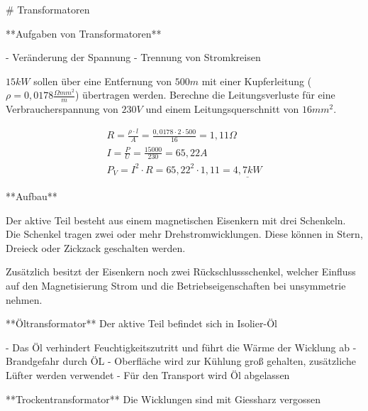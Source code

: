\begin{markdown}

# Transformatoren


**Aufgaben von Transformatoren**

- Veränderung der Spannung
- Trennung von Stromkreisen

\end{markdown}

\vspace{1em}

$15 kW$ sollen über eine Entfernung von $500m$ mit einer Kupferleitung ($\rho = 0,0178 \frac{\Omega mm^2}{m} $) übertragen werden. Berechne die Leitungsverluste für eine Verbraucherspannung von $230 V$ und einem Leitungsquerschnitt von $16mm^2$.

\begin{gather*}
    R = \frac{\rho \cdot l}{A} = \frac{0,0178 \cdot 2 \cdot 500}{16} = 1,11 \Omega \\
    I = \frac{P}{U} = \frac{15000}{230} = 65,22 A \\
    P_V = I^2 \cdot R = 65,22^2 \cdot 1,11 = \underline{4,7 kW}
\end{gather*}

\begin{markdown}

**Aufbau**

Der aktive Teil besteht aus einem magnetischen Eisenkern mit drei Schenkeln. Die Schenkel tragen zwei oder mehr Drehstromwicklungen. Diese können in Stern, Dreieck oder Zickzack geschalten werden.

Zusätzlich besitzt der Eisenkern noch zwei Rückschlussschenkel, welcher Einfluss auf den Magnetisierung Strom und die Betriebseigenschaften bei unsymmetrie nehmen.

\vspace{1em}

**Öltransformator** \qquad Der aktive Teil befindet sich in Isolier-Öl

- Das Öl verhindert Feuchtigkeitszutritt und führt die Wärme der Wicklung ab
- Brandgefahr durch ÖL
- Oberfläche wird zur Kühlung groß gehalten, zusätzliche Lüfter werden verwendet
- Für den Transport wird Öl abgelassen

\vspace{1em}

**Trockentransformator** \quad Die Wicklungen sind mit Giessharz vergossen
\end{markdown}